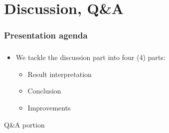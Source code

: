 \section{Discussion, Q\&A}
\begin{frame}
\frametitle{Presentation agenda}
\tableofcontents[currentsection]
\end{frame}

\begin{frame}
\frametitle{\secname}
	\begin{itemize}
		\item We tackle the discussion part into four (4) parts:
			\begin{itemize}
				\item Result interpretation
				\item Conclusion
				\item Improvements
			\end{itemize}
	\end{itemize}
\end{frame}





\begin{frame}
\begin{center}
Q\&A portion
\end{center}
\end{frame}
